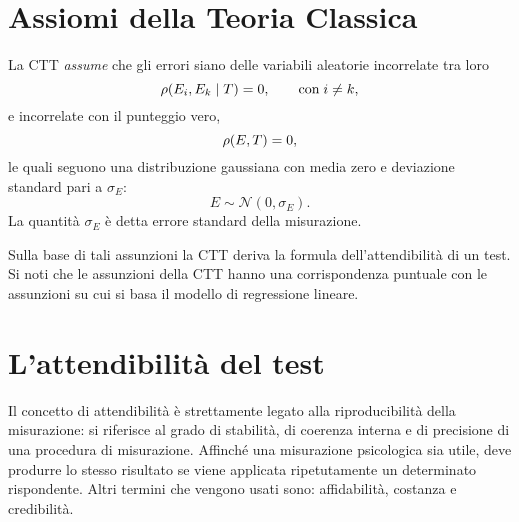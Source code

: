 \section{Assiomi della Teoria Classica}

La CTT \emph{assume} che gli errori siano delle variabili aleatorie
incorrelate tra loro
\begin{equation}
\rho(E_i, E_k \mid T) = 0, \qquad\text{con}\; i \neq k \notag,
\end{equation}
e incorrelate con il punteggio vero,
\begin{equation}
\rho(E, T) = 0, \notag
\end{equation}
le quali seguono una distribuzione gaussiana con media zero e deviazione standard  pari a $\sigma_E$: 
$$E \sim \mathcal{N}(0, \sigma_E).$$
La quantità $\sigma_E$ è detta errore standard della misurazione. 

Sulla base di tali assunzioni la CTT deriva la formula dell'attendibilità di un test.
Si noti che le assunzioni della CTT hanno una corrispondenza puntuale con le assunzioni su cui si basa il modello di regressione lineare. 

\section{L'attendibilità del test}

Il concetto di attendibilità è strettamente legato alla riproducibilità della misurazione: si riferisce al grado di stabilità, di coerenza interna e di precisione di una procedura di misurazione.  Affinché una misurazione psicologica sia utile, deve produrre lo stesso risultato se viene applicata ripetutamente un determinato rispondente.  Altri termini che vengono usati sono: affidabilità, costanza e credibilità.  


